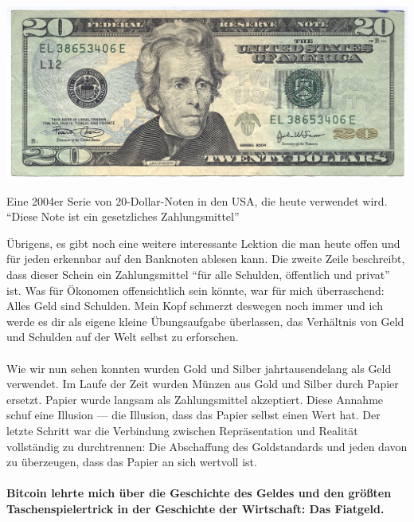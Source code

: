 \begin{center}
  \centering
  \includegraphics[width=\textwidth]{assets/images/us-dollar-2004.jpg}
  \caption{Eine 2004er Serie von 20-Dollar-Noten in den USA, die heute verwendet
  wird. \enquote{Diese Note ist ein gesetzliches Zahlungsmittel}}
  \label{fig:us-dollar-2004}
\end{center}

Übrigens, es gibt noch eine weitere interessante Lektion die man heute offen und
für jeden erkennbar auf den Banknoten ablesen kann. Die zweite Zeile beschreibt,
dass dieser Schein ein Zahlungsmittel \enquote{für alle Schulden, öffentlich und
privat} ist. Was für Ökonomen offensichtlich sein könnte, war für mich
überraschend: Alles Geld sind Schulden. Mein Kopf schmerzt deswegen noch immer
und ich werde es dir als eigene kleine Übungsaufgabe überlassen, das Verhältnis
von Geld und Schulden auf der Welt selbst zu erforschen.

\paragraph{}
Wie wir nun sehen konnten wurden Gold und Silber jahrtausendelang als Geld
verwendet. Im Laufe der Zeit wurden Münzen aus Gold und Silber durch Papier
ersetzt. Papier wurde langsam als Zahlungsmittel akzeptiert. Diese Annahme
schuf eine Illusion --- die Illusion, dass das Papier selbst einen Wert hat. Der
letzte Schritt war die Verbindung zwischen Repräsentation und Realität
vollständig zu durchtrennen: Die Abschaffung des Goldstandards und jeden davon
zu überzeugen, dass das Papier an sich wertvoll ist.

\paragraph{Bitcoin lehrte mich über die Geschichte des Geldes und den größten
Taschenspielertrick in der Geschichte der Wirtschaft: Das Fiatgeld.}


